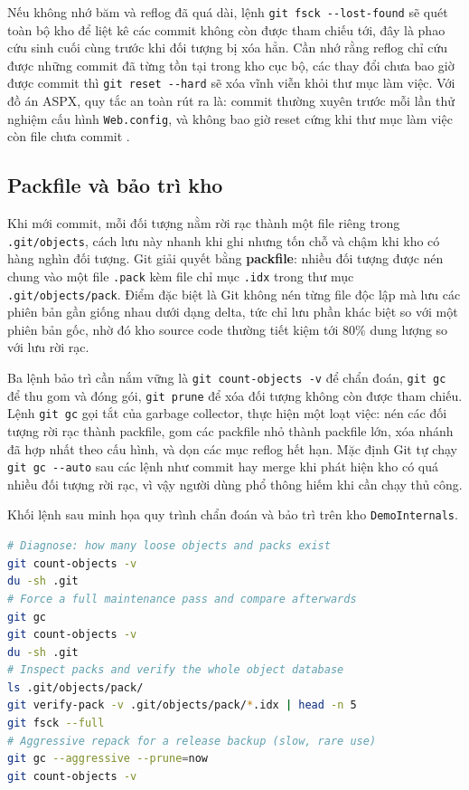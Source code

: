 Nếu không nhớ băm và reflog đã quá dài, lệnh \verb|git fsck --lost-found| sẽ quét toàn bộ kho để liệt kê các commit không còn được tham chiếu tới, đây là phao cứu sinh cuối cùng trước khi đối tượng bị xóa hẳn.
Cần nhớ rằng reflog chỉ cứu được những commit đã từng tồn tại trong kho cục bộ, các thay đổi chưa bao giờ được commit thì \verb|git reset --hard| sẽ xóa vĩnh viễn khỏi thư mục làm việc.
Với đồ án ASPX, quy tắc an toàn rút ra là: commit thường xuyên trước mỗi lần thử nghiệm cấu hình \verb|Web.config|, và không bao giờ reset cứng khi thư mục làm việc còn file chưa commit \cite{progit}.

\subsection{Packfile và bảo trì kho}
\label{subsec:c31-pack}

Khi mới commit, mỗi đối tượng nằm rời rạc thành một file riêng trong \verb|.git/objects|, cách lưu này nhanh khi ghi nhưng tốn chỗ và chậm khi kho có hàng nghìn đối tượng.
Git giải quyết bằng \textbf{packfile}: nhiều đối tượng được nén chung vào một file \verb|.pack| kèm file chỉ mục \verb|.idx| trong thư mục \verb|.git/objects/pack|.
Điểm đặc biệt là Git không nén từng file độc lập mà lưu các phiên bản gần giống nhau dưới dạng delta, tức chỉ lưu phần khác biệt so với một phiên bản gốc, nhờ đó kho source code thường tiết kiệm tới 80\% dung lượng so với lưu rời rạc.

Ba lệnh bảo trì cần nắm vững là \verb|git count-objects -v| để chẩn đoán, \verb|git gc| để thu gom và đóng gói, \verb|git prune| để xóa đối tượng không còn được tham chiếu.
Lệnh \verb|git gc| gọi tắt của garbage collector, thực hiện một loạt việc: nén các đối tượng rời rạc thành packfile, gom các packfile nhỏ thành packfile lớn, xóa nhánh đã hợp nhất theo cấu hình, và dọn các mục reflog hết hạn.
Mặc định Git tự chạy \verb|git gc --auto| sau các lệnh như commit hay merge khi phát hiện kho có quá nhiều đối tượng rời rạc, vì vậy người dùng phổ thông hiếm khi cần chạy thủ công.

Khối lệnh sau minh họa quy trình chẩn đoán và bảo trì trên kho \verb|DemoInternals|.

\begin{lstlisting}[language=bash]
# Diagnose: how many loose objects and packs exist
git count-objects -v
du -sh .git
# Force a full maintenance pass and compare afterwards
git gc
git count-objects -v
du -sh .git
# Inspect packs and verify the whole object database
ls .git/objects/pack/
git verify-pack -v .git/objects/pack/*.idx | head -n 5
git fsck --full
# Aggressive repack for a release backup (slow, rare use)
git gc --aggressive --prune=now
git count-objects -v
\end{lstlisting}

